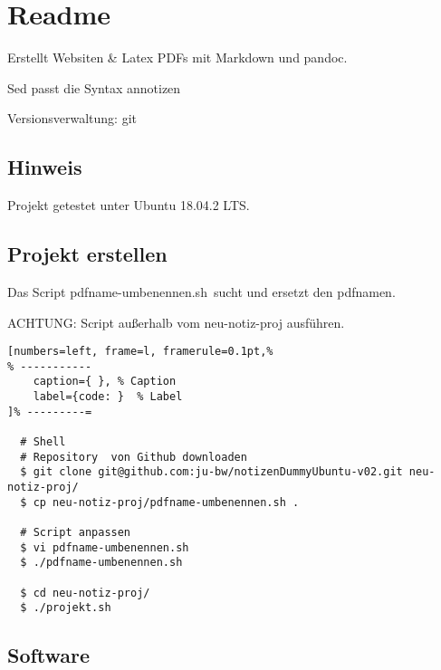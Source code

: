 
\section{Readme}\label{readme}

Erstellt Websiten \& Latex PDFs mit Markdown und pandoc.

Sed passt die Syntax annotizen

Versionsverwaltung: git

\subsection{Hinweis}\label{hinweis}

Projekt getestet unter Ubuntu 18.04.2 LTS.

\subsection{Projekt erstellen}\label{projekt-erstellen}

Das Script \frqq pdfname-umbenennen.sh\flqq\ sucht und ersetzt den pdfnamen.

ACHTUNG: Script außerhalb vom neu-notiz-proj ausführen.

\lstset{language=Bash} %
\begin{lstlisting}[numbers=left, frame=l, framerule=0.1pt,%
% -----------
	caption={ }, % Caption
	label={code: }  % Label
]% ---------=

  # Shell
  # Repository  von Github downloaden
  $ git clone git@github.com:ju-bw/notizenDummyUbuntu-v02.git neu-notiz-proj/
  $ cp neu-notiz-proj/pdfname-umbenennen.sh .

  # Script anpassen
  $ vi pdfname-umbenennen.sh
  $ ./pdfname-umbenennen.sh

  $ cd neu-notiz-proj/
  $ ./projekt.sh
\end{lstlisting}

\subsection{Software}\label{software}

